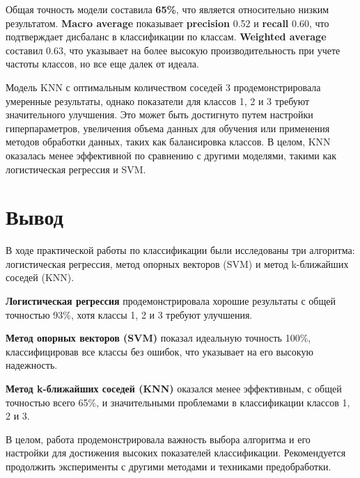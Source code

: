 \documentclass[14pt,a4paper,oneside]{extarticle}
\begin{document}
Общая точность модели составила \textbf{65\%}, что является относительно
низким результатом. \textbf{Macro average} показывает \textbf{precision}
0.52 и \textbf{recall} 0.60, что подтверждает дисбаланс в классификации
по классам. \textbf{Weighted average} составил 0.63, что указывает на
более высокую производительность при учете частоты классов, но все еще
далек от идеала.

Модель KNN с оптимальным количеством соседей 3 продемонстрировала
умеренные результаты, однако показатели для классов 1, 2 и 3 требуют
значительного улучшения. Это может быть достигнуто путем настройки
гиперпараметров, увеличения объема данных для обучения или применения
методов обработки данных, таких как балансировка классов. В целом, KNN
оказалась менее эффективной по сравнению с другими моделями, такими как
логистическая регрессия и SVM.

\clearpage

    \hypertarget{ux432ux44bux432ux43eux434}{%
\section*{\Large{Вывод}}\label{ux432ux44bux432ux43eux434}}

    В ходе практической работы по классификации были исследованы три
алгоритма: логистическая регрессия, метод опорных векторов (SVM) и метод
k-ближайших соседей (KNN).

\textbf{Логистическая регрессия} продемонстрировала хорошие результаты с
общей точностью 93\%, хотя классы 1, 2 и 3 требуют улучшения.

\textbf{Метод опорных векторов (SVM)} показал идеальную точность 100\%,
классифицировав все классы без ошибок, что указывает на его высокую
надежность.

\textbf{Метод k-ближайших соседей (KNN)} оказался менее эффективным, с
общей точностью всего 65\%, и значительными проблемами в классификации
классов 1, 2 и 3.

В целом, работа продемонстрировала важность выбора алгоритма и его
настройки для достижения высоких показателей классификации.
Рекомендуется продолжить эксперименты с другими методами и техниками
предобработки.
\end{document}
